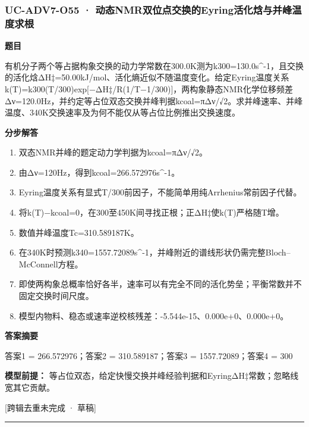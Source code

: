 \documentclass[UTF8,11pt,a4paper]{ctexart}
\begin{document}
\subsubsection*{UC-ADV7-O55 · 动态NMR双位点交换的Eyring活化焓与并峰温度求根}
\noindent\textbf{题目}\par
有机分子两个等占据构象交换的动力学常数在300.0K测为k300=130.0s\textasciicircum{}-1，且交换的活化焓ΔH‡=50.00kJ/mol、活化熵近似不随温度变化。给定Eyring温度关系k(T)=k300(T/300)exp[−ΔH‡/R(1/T−1/300)]，两构象静态NMR化学位移频差Δν=120.0Hz，并约定等占位双态交换并峰判据kcoal=πΔν/√2。求并峰速率、并峰温度、340K交换速率及为何不能仅从等占位比例推出交换速度。\par
\medskip\noindent\textbf{分步解答}
\begin{enumerate}
\item 双态NMR并峰的题定动力学判据为kcoal=πΔν/√2。
\item 由Δν=120Hz，得到kcoal=266.572976s\textasciicircum{}-1。
\item Eyring温度关系有显式T/300前因子，不能简单用纯Arrhenius常前因子代替。
\item 将k(T)−kcoal=0，在300至450K间寻找正根；正ΔH‡使k(T)严格随T增。
\item 数值并峰温度Tc=310.589187K。
\item 在340K时预测k340=1557.72089s\textasciicircum{}-1，并峰附近的谱线形状仍需完整Bloch–McConnell方程。
\item 即使两构象总概率恰好各半，速率可以有完全不同的活化势垒；平衡常数并不固定交换时间尺度。
\item 模型内物料、稳态或速率逆校核残差：-5.544e-15、0.000e+0、0.000e+0。
\end{enumerate}
\noindent\textbf{答案摘要}\par
答案1 = 266.572976；答案2 = 310.589187；答案3 = 1557.72089；答案4 = 300\par
\noindent\textbf{模型前提：}
等占位双态，给定快慢交换并峰经验判据和EyringΔH‡常数；忽略线宽其它贡献。\par
\noindent\textcolor{red!65!black}{[跨辑去重未完成 · 草稿]} \par
\medskip\hrule\medskip
{}
\end{document}
